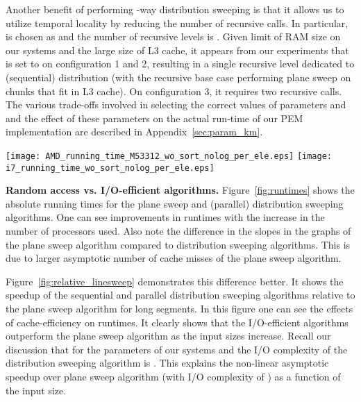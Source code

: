Another benefit of performing -way distribution sweeping is that it
allows us to utilize temporal locality by reducing the number of
recursive calls. In particular,  is chosen as  and
the number of recursive levels is . Given limit of RAM size
on our systems and the large size of L3 cache, it appears from our experiments
that  is set to  on configuration 1 and 2, resulting in a single recursive level
dedicated to (sequential) distribution (with the recursive base case performing
plane sweep on chunks that fit in L3 cache). On configuration 3, it
requires two recursive calls. The various trade-offs involved in
selecting the correct values of parameters  and  and the effect
of these parameters on the actual run-time of our PEM implementation
are described in Appendix~\ref{sec:param_km}.

\begin{figure*}[tb]
\center
\texttt{[image: AMD\_running\_time\_M53312\_wo\_sort\_nolog\_per\_ele.eps]}
\hspace{1cm}
\texttt{[image: i7\_running\_time\_wo\_sort\_nolog\_per\_ele.eps]}
\caption{Runtimes on the configuration~\ref{item:amd} (left) and
  configuration~\ref{item:intel} (right) per element. The plots exclude the times to perform initial
sorting of inputs by the -coordinate for distribution sweeping and
-coordinate for the plane sweep.}
\label{fig:runtimes}
\end{figure*}

\textbf{Random access vs. I/O-efficient algorithms.} 
 Figure~\ref{fig:runtimes} shows the absolute running times for the plane sweep
and (parallel) distribution sweeping algorithms. One can see improvements in
runtimes with the increase in the number of processors used. Also note the
difference in the slopes in the graphs of the plane sweep algorithm compared to
distribution sweeping algorithms. This is due to larger asymptotic number of
cache misses of the plane sweep algorithm. 

Figure~\ref{fig:relative_linesweep} demonstrates this difference better. It
shows the speedup of the sequential and parallel distribution sweeping
algorithms relative to the plane sweep algorithm for long segments. In this
figure one can see the effects of cache-efficiency on runtimes.  It clearly
shows that the I/O-efficient algorithms outperform the plane sweep algorithm as
the input sizes increase. Recall our discussion that for the parameters of our
systems  and the I/O complexity of the distribution sweeping algorithm
is . This explains the non-linear
asymptotic speedup over plane sweep algorithm (with I/O complexity of
) as a function of the input size.

